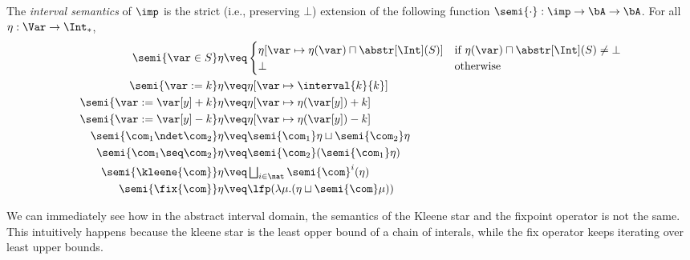 \begin{definition}\label{de:intervalsem}
  The \emph{interval semantics} of \(\imp\) is the strict (i.e.,
  preserving \(\bot\))
  extension of the following function \(\semi{\cdot}: \imp \to
  \bA \to \bA\). For all \(\eta: \Var \to \Int_*\),
  \begin{align*}
    \semi{\var \in S}\eta 
    & \veq  
      \begin{cases}
        \eta[\var \mapsto \eta(\var)\sqcap \abstr[\Int](S)] & \text{if
                                                              }\eta(\var)\sqcap \abstr[\Int](S)\neq \bot \\ \bot &
                                                                                                                   \text{otherwise}
      \end{cases}\\
    \semi{\var := k}\eta 
    & \veq \eta[\var \mapsto \interval{k}{k}]\\
    \semi{\var := \var[y] + k}\eta 
    & \veq \eta[\var \mapsto \eta (\var[y]) + k]\\
    \semi{\var := \var[y] - k}\eta 
    & \veq \eta[\var \mapsto \eta (\var[y]) - k]\\
    \semi{\com_1 \ndet \com_2} \eta
    & \veq \semi{\com_1} \eta \sqcup \semi{\com_2} \eta\\
    \semi{\com_1 \seq \com_2} \eta
    & \veq \semi{\com_2} (\semi{\com_1} \eta)\\
    \semi{\kleene{\com}} \eta
    & \veq \textstyle \bigsqcup_{i \in \nat} \semi{\com}^i (\eta)\\
    \semi{\fix{\com}} \eta
    & \veq  \lfp(\lambda \mu. (\eta \sqcup \semi{\com} \mu))
  \end{align*}
\end{definition}

We can immediately see how in the abstract interval domain, the
semantics of the Kleene star and the fixpoint operator is not the
same. This intuitively happens because the kleene star is the least
opper bound of a chain of interals, while the fix operator keeps
iterating over least upper bounds.

